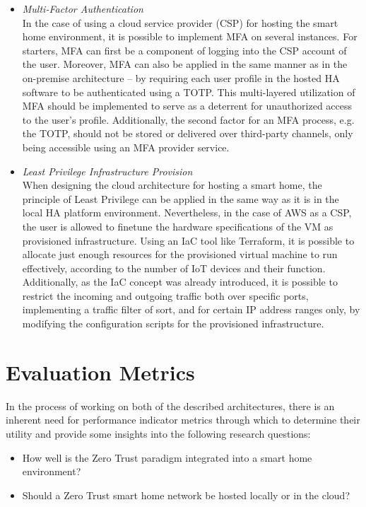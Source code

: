 \begin{itemize}
    \item \textit{Multi-Factor Authentication}\\
    In the case of using a cloud service provider (CSP) for hosting the smart home environment, it is possible to implement MFA on several instances. For starters, MFA can first be a component of logging into the CSP account of the user. Moreover, MFA can also be applied in the same manner as in the on-premise architecture -- by requiring each user profile in the hosted HA software to be authenticated using a TOTP. This multi-layered utilization of MFA should be implemented to serve as a deterrent for unauthorized access to the user's profile.
    Additionally, the second factor for an MFA process, e.g. the TOTP, should not be stored or delivered over third-party channels, only being accessible using an MFA provider service.
    
    \item \textit{Least Privilege Infrastructure Provision}\\
    When designing the cloud architecture for hosting a smart home, the principle of Least Privilege can be applied in the same way as it is in the local HA platform environment. Nevertheless, in the case of AWS as a CSP, the user is allowed to finetune the hardware specifications of the VM as provisioned infrastructure. Using an IaC tool like Terraform, it is possible to allocate just enough resources for the provisioned virtual machine to run effectively, according to the number of IoT devices and their function. Additionally, as the IaC concept was already introduced, it is possible to restrict the incoming and outgoing traffic both over specific ports, implementing a traffic filter of sort, and for certain IP address ranges only, by modifying the configuration scripts for the provisioned infrastructure.
\end{itemize}

\section{Evaluation Metrics}
In the process of working on both of the described architectures, there is an inherent need for performance indicator metrics through which to determine their utility and provide some insights into the following research questions:
\begin{itemize}
    \item How well is the Zero Trust paradigm integrated into a smart home environment?
    \item Should a Zero Trust smart home network be hosted locally or in the cloud?
\end{itemize}

